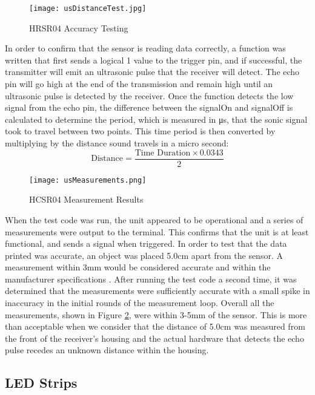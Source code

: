 \documentclass[12pt]{article} %
\begin{document}
\begin{figure}[H]
  \centering
  \texttt{[image: usDistanceTest.jpg]}
  \caption{HRSR04 Accuracy Testing}
  \label{fig:accuracy test}
\end{figure}

In order to confirm that the sensor is reading data correctly, a function was written that first sends a logical 1 value to the trigger pin, and if successful, the transmitter will emit an ultrasonic pulse that the receiver will detect. The echo pin will go high at the end of the transmission and remain high until an ultrasonic pulse is detected by the receiver. Once the function detects the low signal from the echo pin, the difference between the signalOn and signalOff is calculated to determine the period, which is measured in \si{\micro\second}, that the sonic signal took to travel between two points. This time period is then converted by multiplying by the distance sound travels in a micro second:
\begin{equation}
\text{Distance} = \frac{\text{Time Duration} \times 0.0343}{2}
\end{equation}


\begin{figure}[H]
  \centering
  \texttt{[image: usMeasurements.png]}
  \caption{HCSR04 Measurement Results}
  \label{fig:HCSR04 Accuracy Test}
\end{figure}

\pagebreak

When the test code was run, the unit appeared to be operational and a series of measurements were output to the terminal. This confirms that the unit is at least functional, and sends a signal when triggered. In order to test that the data printed was accurate, an object was placed 5.0cm apart from the sensor. A measurement within 3mm would be considered accurate and within the manufacturer specifications \cite{ref_hcsr04}. After running the test code a second time, it was determined that the measurements were sufficiently accurate with a small spike in inaccuracy in the initial rounds of the measurement loop. Overall all the measurements, shown in Figure \ref{fig:HCSR04 Accuracy Test}, were within 3-5mm of the sensor. This is more than acceptable when we consider that the distance of 5.0cm was measured from the front of the receiver’s housing and the actual hardware that detects the echo pulse recedes an unknown distance within the housing. 

\subsection{LED Strips}
\end{document}
